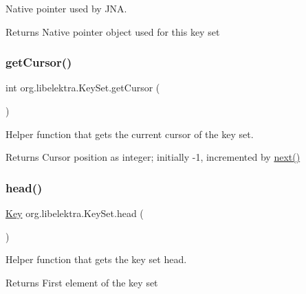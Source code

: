 Native pointer used by J\+NA. 

\begin{DoxyReturn}{Returns}
Native pointer object used for this key set 
\end{DoxyReturn}
\mbox{\label{classorg_1_1libelektra_1_1KeySet_a37e6d574b4595021a6cc732e325219e1}} 
\subsubsection{\texorpdfstring{getCursor()}{getCursor()}}
{\footnotesize\ttfamily int org.\+libelektra.\+Key\+Set.\+get\+Cursor (\begin{DoxyParamCaption}{ }\end{DoxyParamCaption})\hspace{0.3cm}{\ttfamily [inline]}}



Helper function that gets the current cursor of the key set. 

\begin{DoxyReturn}{Returns}
Cursor position as integer; initially -\/1, incremented by \mbox{\hyperlink{classorg_1_1libelektra_1_1KeySet_a92aa593320132e4272602dda29aee2c7}{next()}} 
\end{DoxyReturn}
\mbox{\label{classorg_1_1libelektra_1_1KeySet_a11ba1ef1213a9f1ac5743491bc7154e5}} 
\subsubsection{\texorpdfstring{head()}{head()}}
{\footnotesize\ttfamily \mbox{\hyperlink{classorg_1_1libelektra_1_1Key}{Key}} org.\+libelektra.\+Key\+Set.\+head (\begin{DoxyParamCaption}{ }\end{DoxyParamCaption})\hspace{0.3cm}{\ttfamily [inline]}}



Helper function that gets the key set head. 

\begin{DoxyReturn}{Returns}
First element of the key set 
\end{DoxyReturn}
\mbox{\label{classorg_1_1libelektra_1_1KeySet_a1a3b37dff55df600c4fee6bea714a8d9}} 
